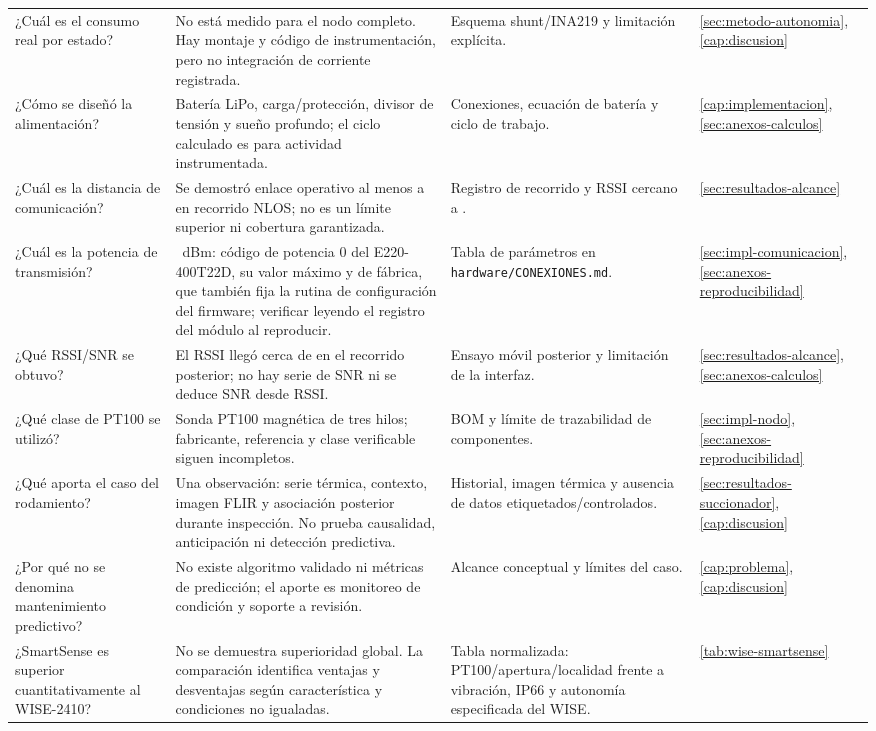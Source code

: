 \begin{longtable}{@{}>{\raggedright\arraybackslash}p{3.15cm}>{\raggedright\arraybackslash}p{4.25cm}>{\raggedright\arraybackslash}p{4.35cm}>{\raggedright\arraybackslash}p{2.65cm}@{}}
¿Cuál es el consumo real por estado? & No está medido para el nodo completo. Hay montaje y código de instrumentación, pero no integración de corriente registrada. & Esquema shunt/INA219 y limitación explícita. & \ref{sec:metodo-autonomia}, \ref{cap:discusion} \\
¿Cómo se diseñó la alimentación? & Batería LiPo, carga/protección, divisor de tensión y sueño profundo; el ciclo calculado es \CicloTrabajo{} para actividad instrumentada. & Conexiones, ecuación de batería y ciclo de trabajo. & \ref{cap:implementacion}, \ref{sec:anexos-calculos} \\
¿Cuál es la distancia de comunicación? & Se demostró enlace operativo al menos a \DistanciaDemostrada{} en recorrido NLOS; no es un límite superior ni cobertura garantizada. & Registro de recorrido y RSSI cercano a \RSSILejano{}. & \ref{sec:resultados-alcance} \\
¿Cuál es la potencia de transmisión? & 22~dBm: código de potencia 0 del E220-400T22D, su valor máximo y de fábrica, que también fija la rutina de configuración del firmware; verificar leyendo el registro del módulo al reproducir. & Tabla de parámetros en \texttt{hardware/CONEXIONES.md}. & \ref{sec:impl-comunicacion}, \ref{sec:anexos-reproducibilidad} \\
¿Qué RSSI/SNR se obtuvo? & El RSSI llegó cerca de \RSSILejano{} en el recorrido posterior; no hay serie de SNR ni se deduce SNR desde RSSI. & Ensayo móvil posterior y limitación de la interfaz. & \ref{sec:resultados-alcance}, \ref{sec:anexos-calculos} \\
¿Qué clase de PT100 se utilizó? & Sonda PT100 magnética de tres hilos; fabricante, referencia y clase verificable siguen incompletos. & BOM y límite de trazabilidad de componentes. & \ref{sec:impl-nodo}, \ref{sec:anexos-reproducibilidad} \\
¿Qué aporta el caso del rodamiento? & Una observación: serie térmica, contexto, imagen FLIR y asociación posterior durante inspección. No prueba causalidad, anticipación ni detección predictiva. & Historial, imagen térmica y ausencia de datos etiquetados/controlados. & \ref{sec:resultados-succionador}, \ref{cap:discusion} \\
¿Por qué no se denomina mantenimiento predictivo? & No existe algoritmo validado ni métricas de predicción; el aporte es monitoreo de condición y soporte a revisión. & Alcance conceptual y límites del caso. & \ref{cap:problema}, \ref{cap:discusion} \\
¿SmartSense es superior cuantitativamente al WISE-2410? & No se demuestra superioridad global. La comparación identifica ventajas y desventajas según característica y condiciones no igualadas. & Tabla normalizada: PT100/apertura/localidad frente a vibración, IP66 y autonomía especificada del WISE. & \ref{tab:wise-smartsense} \\

\end{longtable}
